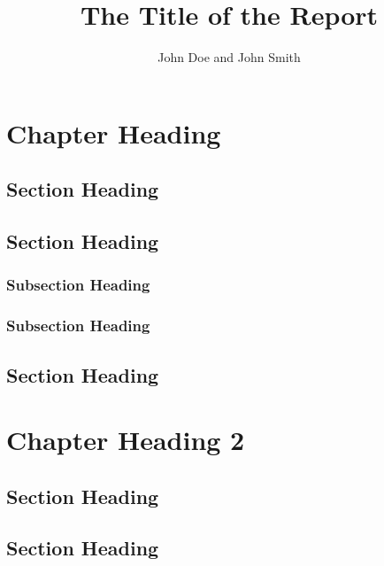 \documentclass{aaltoseries}
\author{John Doe and John Smith}
\title{The Title of the Report}
\begin{document}
\draftabstract{\lipsum[1-3]}

\begin{preface}%
\lipsum[1-4]
\end{preface}

\tableofcontents

\chapter{Chapter Heading}
\section{Section Heading}
\lipsum[1-4]
\section{Section Heading}
\lipsum[5-6]
\subsection{Subsection Heading}
\lipsum[7-8]
\subsection{Subsection Heading}
\lipsum[9-10]
\section{Section Heading}
\lipsum[11-12]


\chapter{Chapter Heading 2}
\section{Section Heading}
\lipsum[1-4]
\section{Section Heading}
\lipsum[5-6]
\end{document}
